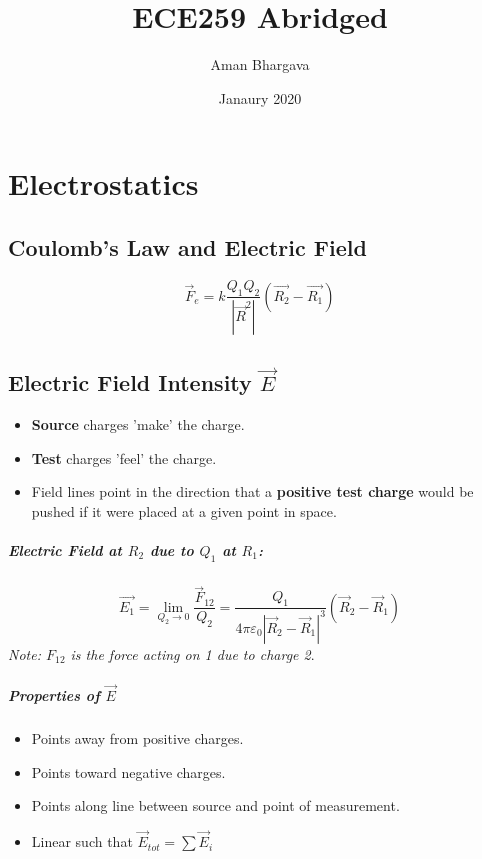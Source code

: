\documentclass[a4paper,12pt]{report}
\begin{document}
\title{ECE259 Abridged}
\author{Aman Bhargava}
\date{Janaury 2020}
\maketitle

\tableofcontents


\chapter{Electrostatics}
\section{Coulomb's Law and Electric Field}

$$\vec{F}_e = k\frac{Q_1Q_2}{|\vec{R}^2|}(\vec{R_2} - \vec{R_1})$$

\section{Electric Field Intensity $\vec{E}$}
\begin{itemize}
\item \textbf{Source} charges 'make' the charge.
\item \textbf{Test} charges 'feel' the charge.
\item Field lines point in the direction that a \textbf{positive test charge} would be pushed if it were placed at a given point in space.
\end{itemize}

\paragraph{Electric Field at $R_2$ due to $Q_1$ at $R_1$: }
$$\vec{E_1} = \lim_{Q_2 \to 0} \frac{\vec{F}_{12}}{Q_2} = \frac{Q_1}{4\pi \varepsilon_0 |\vec{R}_2 - \vec{R}_1|^3}(\vec{R}_2 - \vec{R}_1)$$
\textit{Note: $F_{12}$ is the force acting on 1 due to charge 2}.

\paragraph{Properties of $\vec{E}$}
\begin{itemize}
\item Points away from positive charges.
\item Points toward negative charges.
\item Points along line between source and point of measurement.
\item Linear such that $\vec{E}_{tot} = \sum \vec{E}_i$
\end{itemize}
\end{document}
